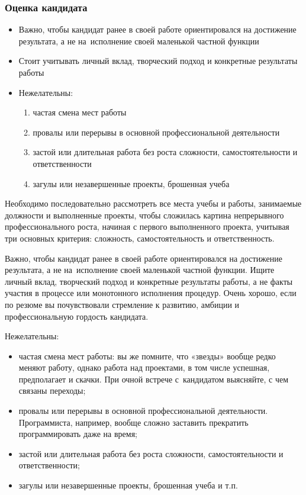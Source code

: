 \documentclass{../industrial-development}
\begin{document}
\begin{frame} \frametitle{Оценка кандидата}
   \begin{itemize}

\item Важно, чтобы кандидат ранее в своей работе ориентировался на достижение результата, а не на~исполнение своей маленькой частной функции
\item Стоит учитывать личный вклад, творческий подход и конкретные результаты работы
\item Нежелательны:
  \begin{enumerate}
	\item частая смена мест работы
\item	провалы или перерывы в основной профессиональной деятельности
\item	застой или длительная работа без роста сложности, самостоятельности и ответственности
\item загулы или незавершенные проекты, брошенная учеба

\end{enumerate}
\end{itemize}
\end{frame}

\lecturenotes

Необходимо последовательно рассмотреть все места учебы и работы, занимаемые должности и выполненные проекты, чтобы сложилась картина непрерывного профессионального роста, начиная с первого выполненного проекта, учитывая три основных критерия: сложность, самостоятельность и ответственность.

Важно, чтобы кандидат ранее в своей работе ориентировался на достижение результата, а не на~исполнение своей маленькой частной функции. Ищите личный вклад, творческий подход и конкретные результаты работы, а не факты участия в процессе или монотонного исполнения процедур. Очень хорошо, если по резюме вы почувствовали стремление к развитию, амбиции и профессиональную гордость кандидата.

Нежелательны:
 \begin{itemize}
\item	частая смена мест работы: вы же помните, что «звезды» вообще редко меняют работу, однако работа над проектами, в том числе успешная, предполагает и скачки. При очной встрече с~кандидатом выясняйте, с чем связаны переходы;

\item	провалы или перерывы в основной профессиональной деятельности. Программиста, например, вообще сложно заставить прекратить программировать даже на время;

\item	застой или длительная работа без роста сложности, самостоятельности и ответственности;

\item	загулы или незавершенные проекты, брошенная учеба и т.п.
 \end{itemize}
\end{document}
